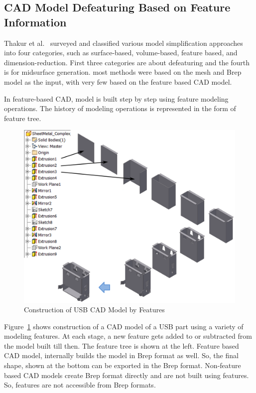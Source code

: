 
\subsection{CAD Model Defeaturing Based on Feature Information}

Thakur et al.~\cite{Thakur2009} surveyed and classified various model simplification approaches into four categories, such as surface-based, volume-based, feature based, and dimension-reduction. First three categories are about defeaturing and the fourth is for midsurface generation.  most methods were based on the mesh and Brep model as the input, with very few based on the feature based CAD model. 

In feature-based CAD, model is built step by step using feature modeling operations. The history of modeling operations is represented in the form of feature tree.


	\begin{figure} [!h]
		\centering
		\includegraphics[width=0.75\linewidth]{..//Common/images/usbfeaturetree_arrow.pdf}
		\caption{Construction of USB CAD Model by Features}
		\label{fig:introduction:usbtree}
	\end{figure} 


Figure~\ref{fig:introduction:usbtree} shows construction of a CAD model of a USB part using a variety of modeling features. At each stage, a new feature gets added to or subtracted from the model built till then. The feature tree is shown at the left. Feature based CAD model, internally builds the model in Brep format as well. So, the final shape, shown at the bottom can be exported in the Brep format. Non-feature based CAD models create Brep format directly and are not built using features. So, features are not accessible from Brep formats.

